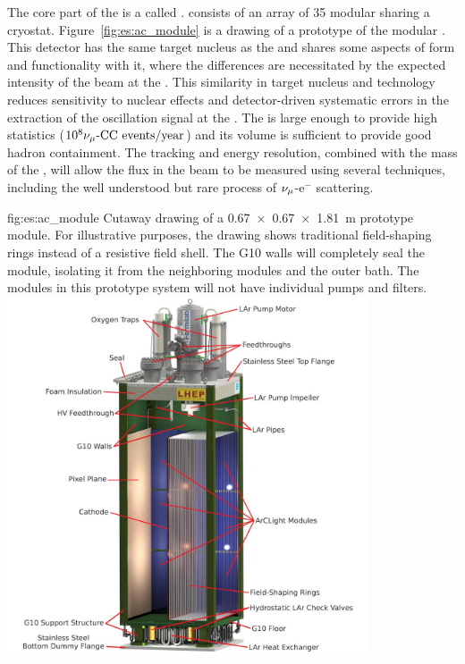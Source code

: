 The core part of the   is a  called .  
 consists of an array of 35 modular  sharing a cryostat.  Figure~\ref{fig:es:ac_module} is a  drawing of a prototype of the modular .  
This detector has the same target nucleus as the  and shares some aspects of form and functionality with it, where the differences are necessitated by the expected intensity of the beam at the .  This similarity in target nucleus and technology reduces sensitivity to nuclear effects and detector-driven systematic errors in the extraction of the oscillation signal at the  .  The  is large enough to provide high statistics 
($\num{e8}{\numu \text{-CC events/year}}$) and its volume  is sufficient to provide good hadron containment.  The tracking and energy resolution, combined with the mass of the , will allow the flux in the beam to be measured using several techniques, including the well understood but rare process of $\nu_\mu$-e$^{-}$ scattering.

\begin{dunefigure}{fig:es:ac_module}
{Cutaway drawing of a \SI{0.67 x 0.67 x 1.81}{\metre}  prototype module. For illustrative purposes, the drawing shows traditional field-shaping rings instead of a resistive field shell. The G10 walls will completely seal the module, isolating it from the neighboring modules and the outer  bath. The modules in this prototype system will not have individual pumps and filters.}
\includegraphics[width=0.8\textwidth]{graphics/Normal-Module-4K_labelled.jpeg}
\end{dunefigure}


